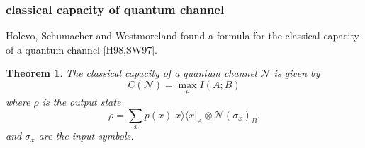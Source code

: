\documentclass[12pt]{beamer}
\newcommand{\mcal}{\mathcal}
\newcommand{\bra}[1]{\langle #1|}
\newcommand{\ket}[1]{|#1 \rangle}
\newcommand{\ketbra}[1]{\ket{#1}\bra{#1}}
\newcommand{\be}{\begin{equation}}
\newcommand{\ee}{\end{equation}}
\theoremstyle{plain}
\newtheorem{Th}{Theorem}[section]
\theoremstyle{definition}
\begin{document}


\begin{frame}
	\frametitle{classical capacity of quantum channel}
    
    Holevo, Schumacher and Westmoreland found a formula
    for the classical capacity of a quantum channel [H98,SW97].

	\begin{Th}
		The classical capacity of a quantum channel $\mcal{N}$ is
		given by
		\be
	       		C(\mcal{N}) = \max_\rho I(A;B) 
	    	\ee
		where $\rho$ is the output state 
		    \be
		        \rho = \sum_x p(x) \ketbra{x}_A \otimes \mcal{N}\!({\sigma_x})_B.
		    \ee
		    and $\sigma_x$ are the input symbols.
	    \end{Th}
		
\end{frame}




\end{document}
